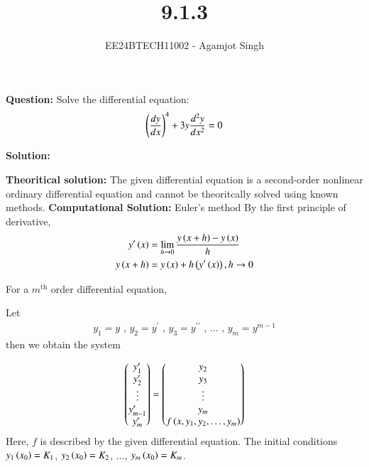 \documentclass[journal]{IEEEtran}
\begin{document}

\vspace{3cm}

\title{9.1.3}
\author{EE24BTECH11002 - Agamjot Singh}
{\let\newpage\relax\maketitle}

\renewcommand{\thefigure}{\theenumi}
\renewcommand{\thetable}{\theenumi}
\setlength{\intextsep}{10pt} %

\textbf{Question:}
\newline
Solve the differential equation:
\begin{align}
    \left(\frac{dy}{dx}\right)^4 + 3y{\frac{d^2 y}{d x^2}} = 0
\end{align}

\textbf{Solution:}

\textbf{Theoritical solution:}
\newline
The given differential equation is a second-order nonlinear ordinary differential equation and cannot be theoritcally solved using known methods.
\newline
\textbf{Computational Solution:} Euler's method
\newline
By the first principle of derivative,
\begin{align}
    y^{\prime}\left(x\right) &= \lim_{h\to0} \frac{y\left(x + h\right) - y\left(x\right)}{h}\\
    y\left(x + h\right) &= y\left(x\right) + h\left(y^{\prime}\left(x\right)\right), h\to0
\end{align}

For a $m^{\text{th}}$ order differential equation,
\newline

Let 
\begin{align}
    y_1 = y \text{ , } y_2 = y^{\prime} \text{ , } y_3 = y^{\prime\prime} \text{ , } \dots \text{ , } y_m = y^{m - 1}
\end{align}
then we obtain the system

\begin{align}
    \begin{pmatrix}y_1^{\prime}\\y_2^{\prime}\\\vdots\\y_{m - 1}^{\prime}\\y_m^{\prime}\end{pmatrix} = \begin{pmatrix}y_2\\y_3\\\vdots\\y_m\\f\left(x, y_1, y_2,\dots,y_m\right)\end{pmatrix}
\end{align}
Here, $f$ is described by the given differential equation. The initial conditions $y_1\left(x_0\right) = K_1$, $y_2\left(x_0\right) = K_2$, $\dots$, $y_m\left(x_0\right) = K_m$.
\end{document}
